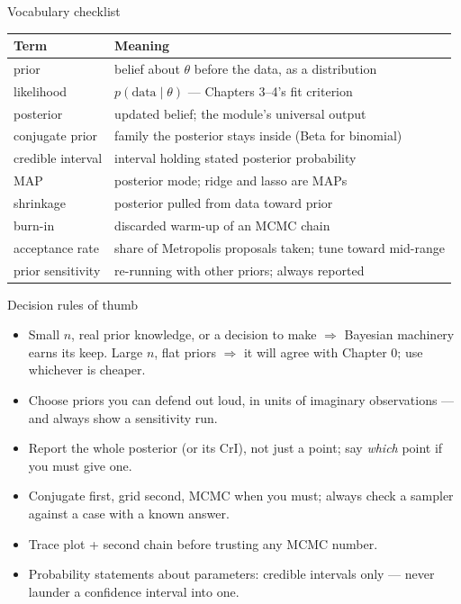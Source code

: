 \documentclass[aspectratio=169,11pt]{beamer}
\begin{document}
\begin{frame}{Vocabulary checklist}
  \footnotesize
  \begin{center}
  \begin{tabular}{@{}ll@{}}
    \toprule
    \textbf{Term} & \textbf{Meaning} \\
    \midrule
    prior & belief about $\theta$ before the data, as a distribution \\
    likelihood & $p(\text{data} \mid \theta)$ --- Chapters 3--4's fit criterion \\
    posterior & updated belief; the module's universal output \\
    conjugate prior & family the posterior stays inside (Beta for binomial) \\
    credible interval & interval holding stated posterior probability \\
    MAP & posterior mode; ridge and lasso are MAPs \\
    shrinkage & posterior pulled from data toward prior \\
    burn-in & discarded warm-up of an MCMC chain \\
    acceptance rate & share of Metropolis proposals taken; tune toward mid-range \\
    prior sensitivity & re-running with other priors; always reported \\
    \bottomrule
  \end{tabular}
  \end{center}
\end{frame}

\begin{frame}{Decision rules of thumb}
  \begin{itemize}
    \item Small $n$, real prior knowledge, or a decision to make $\Rightarrow$
          Bayesian machinery earns its keep. Large $n$, flat priors $\Rightarrow$
          it will agree with Chapter 0; use whichever is cheaper.
    \item Choose priors you can defend out loud, in units of imaginary
          observations --- and always show a sensitivity run.
    \item Report the whole posterior (or its CrI), not just a point; say
          \emph{which} point if you must give one.
    \item Conjugate first, grid second, MCMC when you must; always check a sampler
          against a case with a known answer.
    \item Trace plot + second chain before trusting any MCMC number.
    \item Probability statements about parameters: credible intervals only ---
          never launder a confidence interval into one.
  \end{itemize}
\end{frame}
\end{document}
